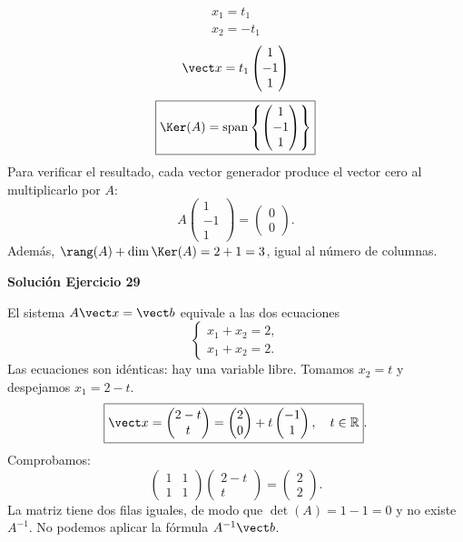 \[
\begin{aligned}x_{1}=t_{1}\\x_{2}=- t_{1}\end{aligned}
\]
\[
\vect x=t_{1}\begin{pmatrix}1\\-1\\1\end{pmatrix}
\]
\[
\boxed{\Ker(A)=\operatorname{span}\left\{\begin{pmatrix}1\\-1\\1\end{pmatrix}\right\}}
\]
Para verificar el resultado, cada vector generador produce el vector cero al multiplicarlo por $A$:
\[
A\begin{pmatrix}1\\-1\\1\end{pmatrix}=\begin{pmatrix}0\\0\end{pmatrix}.
\]
Además, $\rang(A)+\dim\Ker(A)=2+1=3$, igual al número de columnas.


\par\bigskip\noindent\textbf{Solución Ejercicio 29}\par\nobreak
El sistema $A\vect x=\vect b$ equivale a las dos ecuaciones
\[
\begin{cases}x_1+x_2=2,\\x_1+x_2=2.\end{cases}
\]
Las ecuaciones son idénticas: hay una variable libre. Tomamos $x_2=t$ y despejamos $x_1=2-t$.
\[
\boxed{\vect x=\begin{pmatrix}2-t\\t\end{pmatrix}=\begin{pmatrix}2\\0\end{pmatrix}+t\begin{pmatrix}-1\\1\end{pmatrix},\quad t\in\mathbb R}.
\]
Comprobamos:
\[
\begin{pmatrix}1&1\\1&1\end{pmatrix}\begin{pmatrix}2-t\\t\end{pmatrix}=\begin{pmatrix}2\\2\end{pmatrix}.
\]
La matriz tiene dos filas iguales, de modo que $\det(A)=1-1=0$ y no existe $A^{-1}$. No podemos aplicar la fórmula $A^{-1}\vect b$.


